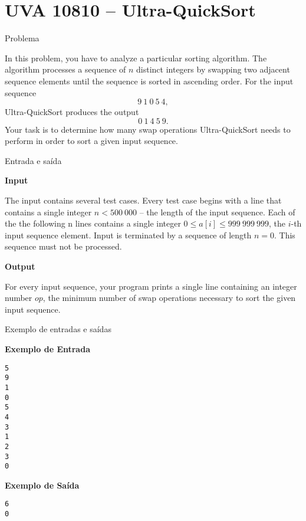 \section{UVA 10810 -- Ultra-QuickSort}

\begin{frame}[fragile]{Problema}

In this problem, you have to analyze a particular sorting algorithm. The algorithm
processes a sequence of $n$ distinct integers by swapping two adjacent sequence elements until 
the sequence is sorted in ascending order. For the input sequence
\[
9\ 1\ 0\ 5\ 4,
\]
Ultra-QuickSort produces the output
\[
0\ 1\ 4\ 5\ 9.
\]
Your task is to determine how many swap operations Ultra-QuickSort needs to
perform in order to sort a given input sequence.

\end{frame}

\begin{frame}[fragile]{Entrada e saída}

\textbf{Input}

The input contains several test cases. Every test case begins with a line that
contains a single integer $n < 500\ 000$ -- the length of the input sequence. Each of
the the following n lines contains a single integer $0\leq a[i]\leq 999\ 999\ 999$, the $i$-th
input sequence element. Input is terminated by a sequence of length $n = 0$. This
sequence must not be processed.

\textbf{Output}

For every input sequence, your program prints a single line containing an integer
number $op$, the minimum number of swap operations necessary to sort the given
input sequence.

\end{frame}

\begin{frame}[fragile]{Exemplo de entradas e saídas}

\begin{minipage}[t]{0.5\textwidth}
\textbf{Exemplo de Entrada}
\begin{verbatim}
5
9
1
0
5
4
3
1
2
3
0
\end{verbatim}
\end{minipage}
\begin{minipage}[t]{0.45\textwidth}
\textbf{Exemplo de Saída}
\begin{verbatim}
6
0
\end{verbatim}
\end{minipage}
\end{frame}

